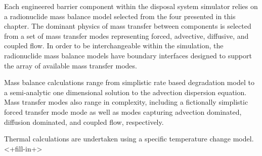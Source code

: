 Each engineered barrier component within the \Cyder disposal system simulator 
relies on a radionuclide mass balance model selected from the four presented in 
this chapter.  The dominant physics of mass transfer between components is 
selected from a set of mass transfer modes representing forced, advective, 
diffusive, and coupled flow.  In order to be interchangeable within the 
simulation, the radionuclide mass balance models have boundary interfaces 
designed to support the array of available mass transfer modes. 

Mass balance calculations range from simplistic rate based degradation model to 
a semi-analytic one dimensional solution to the advection dispersion equation.  
Mass transfer modes also range in complexity, including a fictionally 
simplistic forced transfer mode mode as well as modes capturing advection 
dominated, diffusion dominated, and coupled flow, respectively.


Thermal calculations are undertaken using a specific temperature change model.
<+fill-in+>
